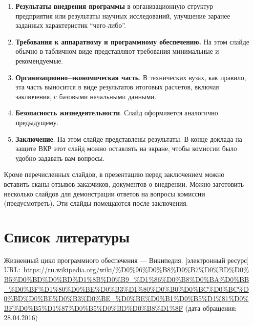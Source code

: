 \documentclass[a4paper,14pt,final]{extreport}
\begin{document}
\begin{enumerate}
\item \textbf{Результаты внедрения программы} в организационную структур предприятия или результаты научных исследований, улучшение заранее заданных характеристик ``чего-либо''.
\item \textbf{Требования к аппаратному и программному обеспечению.}  На этом слайде обычно в табличном виде представляют требования минимальные и рекомендуемые.
\item \textbf{Организационно--экономическая часть}.  В технических вузах, как правило, эта часть выносится в виде результатов итоговых расчетов, включая заключения, с базовыми начальными данными.
\item \textbf{Безопасность жизнедеятельности}.  Слайд оформляется аналогично предыдущему.
\item \textbf{Заключение}.  На этом слайде представлены результаты.  В конце доклада на защите ВКР этот слайд можно оставлять на экране, чтобы комиссии было удобно задавать вам вопросы.
\end{enumerate}

Кроме перечисленных слайдов, в презентацию перед заключением можно вставить сканы отзывов заказчиков, документов о внедрении.  Можно заготовить несколько слайдов для демонстрации ответов на вопросы комиссии (предусмотреть).  Эти слайды помещаются после заключения.

\section{Список литературы}
\label{sec:refs}

\begin{thebibliography}{99}
 Жизненный цикл программного обеспечения --- Википедия. [электронный ресурс] URL:~\url{https://ru.wikipedia.org/wiki/%D0%96%D0%B8%D0%B7%D0%BD%D0%B5%D0%BD%D0%BD%D1%8B%D0%B9_%D1%86%D0%B8%D0%BA%D0%BB_%D0%BF%D1%80%D0%BE%D0%B3%D1%80%D0%B0%D0%BC%D0%BC%D0%BD%D0%BE%D0%B3%D0%BE_%D0%BE%D0%B1%D0%B5%D1%81%D0%BF%D0%B5%D1%87%D0%B5%D0%BD%D0%B8%D1%8F} (дата обращения: 28.04.2016)
\end{thebibliography}
\end{document}
